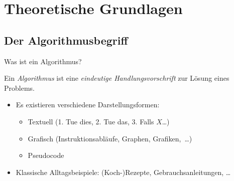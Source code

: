 \section{Theoretische Grundlagen}
\subsection{Der Algorithmusbegriff}
\begin{frame}{Was ist ein Algorithmus?}
    \pause{}
    \begin{definition}[Algorithmus]
        \pause{}Ein \emph{Algorithmus} ist eine \emph{eindeutige Handlungsvorschrift} zur Lösung eines Problems.
    \end{definition}
    \begin{itemize}[<+(1)->]
        \widei
        \item Es existieren verschiedene Darstellungsformen: \begin{itemize}
            \item Textuell \pause(1. Tue dies, 2. Tue das, 3. Falls \(X\)\ldots)
            \item Grafisch \pause(Instruktionsabläufe, Graphen, Grafiken,~\ldots)
            \item Pseudocode
        \end{itemize}
        \item Klassische Alltagsbeispiele:\pause{} (Koch-)Rezepte,\pause{} Gebrauchsanleitungen,\pause{} \ldots
    \end{itemize}
\end{frame}


